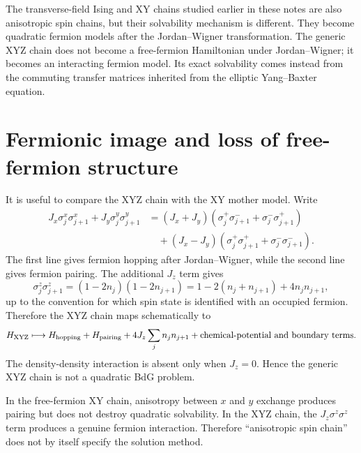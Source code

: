 The transverse-field Ising and XY chains studied earlier in these notes are also
anisotropic spin chains, but their solvability mechanism is different.  They
become quadratic fermion models after the Jordan--Wigner transformation.  The
generic XYZ chain does not become a free-fermion Hamiltonian under
Jordan--Wigner; it becomes an interacting fermion model.  Its exact solvability
comes instead from the commuting transfer matrices inherited from the elliptic
Yang--Baxter equation.

\section{Fermionic image and loss of free-fermion structure}
\label{sec:XYZ-JW-image}

It is useful to compare the XYZ chain with the XY mother model.  Write
\begin{equation}
\label{eq:XYZ-in-ladder-operators}
\begin{aligned}
    J_x\sigma_j^x\sigma_{j+1}^x+J_y\sigma_j^y\sigma_{j+1}^y
    &=(J_x+J_y)
    \left(\sigma_j^+\sigma_{j+1}^-+\sigma_j^-\sigma_{j+1}^+\right)\\
    &\quad
    +(J_x-J_y)
    \left(\sigma_j^+\sigma_{j+1}^++\sigma_j^-\sigma_{j+1}^-\right).
\end{aligned}
\end{equation}
The first line gives fermion hopping after Jordan--Wigner, while the second line
gives fermion pairing.  The additional $J_z$ term gives
\begin{equation}
\label{eq:ZZ-to-density-interaction}
    \sigma_j^z\sigma_{j+1}^z
    =(1-2n_j)(1-2n_{j+1})
    =1-2(n_j+n_{j+1})+4n_jn_{j+1},
\end{equation}
up to the convention for which spin state is identified with an occupied
fermion.  Therefore the XYZ chain maps schematically to
\begin{equation}
\label{eq:XYZ-JW-schematic}
    H_{\rm XYZ}
    \longmapsto
    H_{\rm hopping}+H_{\rm pairing}+4J_z\sum_j n_jn_{j+1}
    +\text{chemical-potential and boundary terms}.
\end{equation}
The density-density interaction is absent only when $J_z=0$.  Hence the generic
XYZ chain is not a quadratic BdG problem.

\begin{remark}
In the free-fermion XY chain, anisotropy between $x$ and $y$ exchange produces
pairing but does not destroy quadratic solvability.  In the XYZ chain, the
$J_z\sigma^z\sigma^z$ term produces a genuine fermion interaction.  Therefore
``anisotropic spin chain'' does not by itself specify the solution method.
\end{remark}

